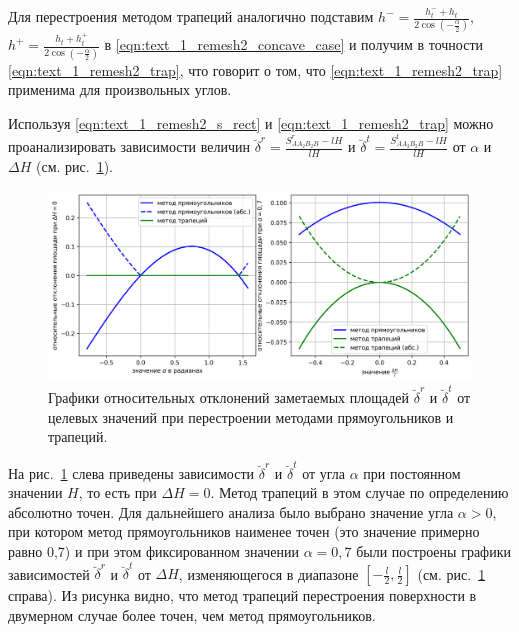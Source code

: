 Для перестроения методом трапеций аналогично подставим $h^{-} = \frac{h_t^{-} + h_t}{2 \cos\left( -\frac{\alpha}{2} \right)}$, $h^{+} = \frac{h_t + h_t^{+}}{2 \cos\left( -\frac{\alpha}{2} \right)}$ в \eqref{eqn:text_1_remesh2_concave_case} и получим в точности \eqref{eqn:text_1_remesh2_trap}, что говорит о том, что \eqref{eqn:text_1_remesh2_trap} применима для произвольных углов.

Используя \eqref{eqn:text_1_remesh2_s_rect} и \eqref{eqn:text_1_remesh2_trap} можно проанализировать зависимости величин $\breve{\delta}^r = \frac{S_{AA_2B_2B}^r - lH}{lH}$ и $\breve{\delta}^t = \frac{S_{AA_2B_2B}^t - lH}{lH}$ от $\alpha$ и $\Delta H$ (см. рис.~\ref{fig:text_1_remesh_2d_main_chart}).

\begin{figure}[h]
\centering
\includegraphics[width=1.0\textwidth]{pics/text_1_remesh_2d/main_chart.png}
\caption{Графики относительных отклонений заметаемых площадей $\breve{\delta}^r$ и $\breve{\delta}^t$ от целевых значений при перестроении методами прямоугольников и трапеций.}
\label{fig:text_1_remesh_2d_main_chart}
\end{figure}

На рис.~\ref{fig:text_1_remesh_2d_main_chart} слева приведены зависимости $\breve{\delta}^r$ и $\breve{\delta}^t$ от угла $\alpha$ при постоянном значении $H$, то есть при $\Delta H = 0$.
Метод трапеций в этом случае по определению абсолютно точен.
Для дальнейшего анализа было выбрано значение угла $\alpha > 0$, при котором метод прямоугольников наименее точен (это значение примерно равно 0,7) и при этом фиксированном значении $\alpha = 0,7$ были построены графики зависимостей $\breve{\delta}^r$ и $\breve{\delta}^t$ от $\Delta H$, изменяющегося в диапазоне $[-\frac{l}{2}, \frac{l}{2}]$ (см. рис.~\ref{fig:text_1_remesh_2d_main_chart} справа).
Из рисунка видно, что метод трапеций перестроения поверхности в двумерном случае более точен, чем метод прямоугольников.
